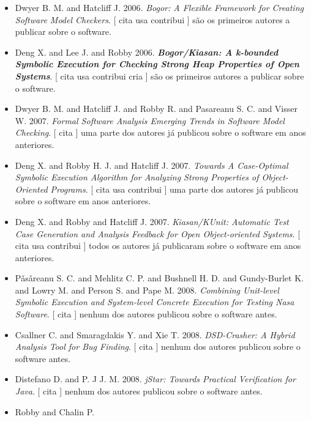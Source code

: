 \begin{itemize}
\item Dwyer B. M. and Hatcliff J.
      2006.
        \textit{ Bogor: A Flexible Framework for Creating Software Model Checkers}.
      [
          cita
          usa
          contribui
      ]
são os primeiros autores a publicar sobre o software.
\item Deng X. and Lee J. and Robby
      2006.
        \textbf{\textit{ Bogor/Kiasan: A k-bounded Symbolic Execution for Checking Strong Heap Properties of Open Systems}}.
      [
          cita
          usa
          contribui
          cria
      ]
são os primeiros autores a publicar sobre o software.
\item Dwyer B. M. and Hatcliff J. and Robby R. and Pasareanu S. C. and Visser W.
      2007.
        \textit{ Formal Software Analysis Emerging Trends in Software Model Checking}.
      [
          cita
      ]
uma parte dos autores já publicou sobre o software em anos anteriores.
\item Deng X. and Robby H. J. and Hatcliff J.
      2007.
        \textit{ Towards A Case-Optimal Symbolic Execution Algorithm for Analyzing Strong Properties of Object-Oriented Programs}.
      [
          cita
          usa
          contribui
      ]
uma parte dos autores já publicou sobre o software em anos anteriores.
\item Deng X. and Robby and Hatcliff J.
      2007.
        \textit{ Kiasan/KUnit: Automatic Test Case Generation and Analysis Feedback for Open Object-oriented Systems}.
      [
          cita
          usa
          contribui
      ]
todos os autores já publicaram sobre o software em anos anteriores.
\item P\v{a}s\v{a}reanu S. C. and Mehlitz C. P. and Bushnell H. D. and Gundy-Burlet K. and Lowry M. and Person S. and Pape M.
      2008.
        \textit{ Combining Unit-level Symbolic Execution and System-level Concrete Execution for Testing Nasa Software}.
      [
          cita
      ]
nenhum dos autores publicou sobre o software antes.
\item Csallner C. and Smaragdakis Y. and Xie T.
      2008.
        \textit{ DSD-Crasher: A Hybrid Analysis Tool for Bug Finding}.
      [
          cita
      ]
nenhum dos autores publicou sobre o software antes.
\item Distefano D. and P. J J. M.
      2008.
        \textit{ jStar: Towards Practical Verification for Java}.
      [
          cita
      ]
nenhum dos autores publicou sobre o software antes.
\item Robby and Chalin P.

\end{itemize}
